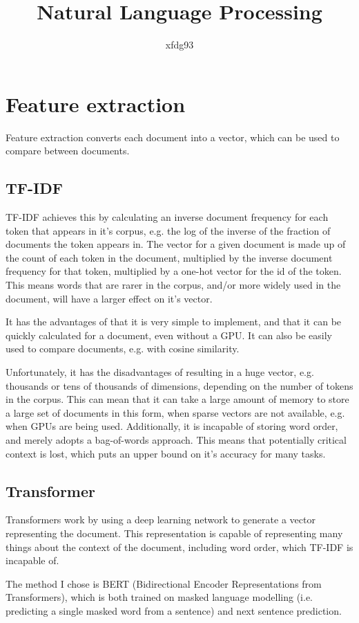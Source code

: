 \documentclass{article}
\title{Natural Language Processing}
\author{xfdg93}
\date{}
\begin{document}
\maketitle

\section{Feature extraction}
		Feature extraction converts each document into a vector, which can be used to compare between documents.
	\subsection{TF-IDF}
		TF-IDF achieves this by calculating an inverse document frequency for each token that appears in it's corpus, e.g. the log of the inverse of the fraction of documents the token appears in.
		The vector for a given document is made up of the count of each token in the document, multiplied by the inverse document frequency for that token, multiplied by a one-hot vector for the id of the token.
		This means words that are rarer in the corpus, and/or more widely used in the document, will have a larger effect on it's vector.

		It has the advantages of that it is very simple to implement, and that it can be quickly calculated for a document, even without a GPU.
		It can also be easily used to compare documents, e.g. with cosine similarity.
		
		Unfortunately, it has the disadvantages of resulting in a huge vector, e.g. thousands or tens of thousands of dimensions, depending on the number of tokens in the corpus.
		This can mean that it can take a large amount of memory to store a large set of documents in this form, when sparse vectors are not available, e.g. when GPUs are being used.
		Additionally, it is incapable of storing word order, and merely adopts a bag-of-words approach. This means that potentially critical context is lost, which puts an upper bound on it's accuracy for many tasks.

	\subsection{Transformer}
		Transformers work by using a deep learning network to generate a vector representing the document.
		This representation is capable of representing many things about the context of the document, including word order, which TF-IDF is incapable of.

		The method I chose is BERT (Bidirectional Encoder Representations from Transformers),
		which is both trained on masked language modelling (i.e. predicting a single masked word from a sentence) and next sentence prediction.
\end{document}

